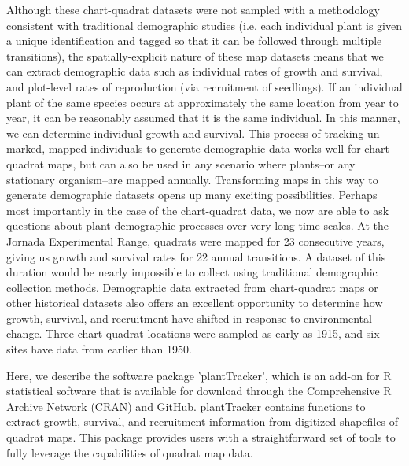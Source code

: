 \documentclass[12pt, letterpaper]{article}
\begin{document}
Although these chart-quadrat datasets were not sampled with a methodology consistent with traditional demographic studies (i.e. each individual plant is given a unique identification and tagged so that it can be followed through multiple transitions), the spatially-explicit nature of these map datasets means that we can extract demographic data such as individual rates of growth and survival, and plot-level rates of reproduction (via recruitment of seedlings). If an individual plant of the same species occurs at approximately the same location from year to year, it can be reasonably assumed that it is the same individual. In this manner, we can determine individual growth and survival. This process of tracking un-marked, mapped individuals to generate demographic data works well for chart-quadrat maps, but can also be used in any scenario where plants--or any stationary organism--are mapped annually. Transforming maps in this way to generate demographic datasets opens up many exciting possibilities. Perhaps most importantly in the case of the chart-quadrat data, we now are able to ask questions about plant demographic processes over very long time scales. At the Jornada Experimental Range, quadrats were mapped for 23 consecutive years, giving us growth and survival rates for 22 annual transitions. A dataset of this duration would be nearly impossible to collect using traditional demographic collection methods. Demographic data extracted from chart-quadrat maps or other historical datasets also offers an excellent opportunity to determine how growth, survival, and recruitment have shifted in response to environmental change. Three chart-quadrat locations were sampled as early as 1915, and six sites have data from earlier than 1950. 

Here, we describe the software package 'plantTracker', which is an add-on for R statistical software \cite{RCoreTeam2021} that is available for download through the Comprehensive R Archive Network (CRAN) and GitHub. plantTracker contains functions to extract growth, survival, and recruitment information from digitized shapefiles of quadrat maps. This package provides users with a straightforward set of tools to fully leverage the capabilities of quadrat map data. 
\end{document}
